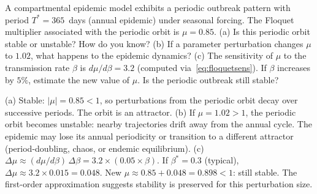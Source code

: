 \begin{selfcheck}
A compartmental epidemic model exhibits a periodic outbreak pattern with
period $T^* = 365$~days (annual epidemic) under seasonal forcing.
The Floquet multiplier associated with the periodic orbit is $\mu = 0.85$.
(a) Is this periodic orbit stable or unstable? How do you know?
(b) If a parameter perturbation changes $\mu$ to $1.02$, what happens
to the epidemic dynamics?
(c) The sensitivity of $\mu$ to the transmission rate $\beta$ is
$d\mu/d\beta = 3.2$ (computed via~\eqref{eq:floquetsens}).
If $\beta$ increases by $5\%$, estimate the new value of $\mu$.
Is the periodic outbreak still stable?
\end{selfcheck}
\begin{scAnswer}
(a) Stable: $|\mu| = 0.85 < 1$, so perturbations from the periodic orbit
decay over successive periods. The orbit is an attractor.
(b) If $\mu = 1.02 > 1$, the periodic orbit becomes unstable: nearby
trajectories drift away from the annual cycle. The epidemic may lose its
annual periodicity or transition to a different attractor (period-doubling,
chaos, or endemic equilibrium).
(c) $\Delta\mu \approx (d\mu/d\beta)\,\Delta\beta = 3.2\times(0.05\times\beta)$.
If $\beta^* = 0.3$ (typical), $\Delta\mu \approx 3.2\times0.015 = 0.048$.
New $\mu \approx 0.85 + 0.048 = 0.898 < 1$: still stable.
The first-order approximation suggests stability is preserved for this perturbation size.
\end{scAnswer}
